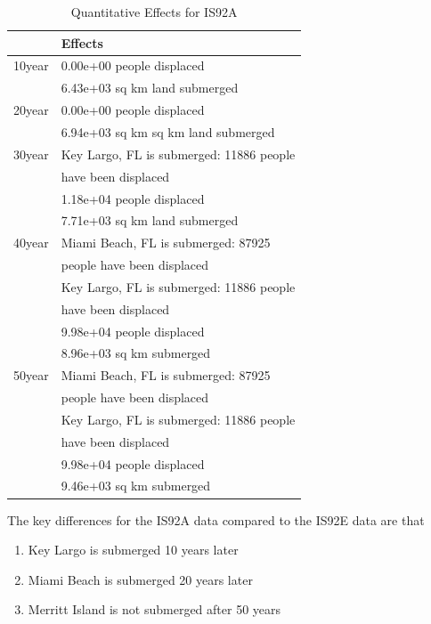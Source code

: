 \documentclass[12pt,a4paper,titlepage]{article}
\begin{document}
\begin{table}[!htb]
\centering \caption{Quantitative Effects for IS92A}
\begin{tabular}{|l|l|}
\hline
 & Effects \\
\hline
10year & 0.00e+00 people displaced \\
\cline{2-2}
 & 6.43e+03 sq km land submerged \\
\hline
20year & 0.00e+00 people displaced \\
\cline{2-2}
 & 6.94e+03 sq km sq km land submerged \\
\hline
30year & Key Largo, FL is submerged: 11886 people \\
 & have been displaced \\
\hline
 & 1.18e+04 people displaced \\
 & 7.71e+03 sq km land submerged \\
\hline
40year & Miami Beach, FL is submerged: 87925 \\
 & people have been displaced \\
 & Key Largo, FL is submerged: 11886 people \\
 & have been displaced \\
\hline
 & 9.98e+04 people displaced \\
 & 8.96e+03 sq km submerged \\
\cline{2-2}
50year & Miami Beach, FL is submerged: 87925 \\
 & people have been displaced \\
\cline{2-2}
 & Key Largo, FL is submerged: 11886 people \\
 & have been displaced \\
\hline
 & 9.98e+04 people displaced \\
 & 9.46e+03 sq km submerged \\
\hline
\end{tabular}
\end{table}

\newpage

 The key differences for the IS92A data compared to the IS92E
data are that

\begin{enumerate}

\item Key Largo is submerged 10 years later

\item Miami Beach is submerged 20 years later

\item Merritt Island is not submerged after 50 years

\end{enumerate}
\end{document}
